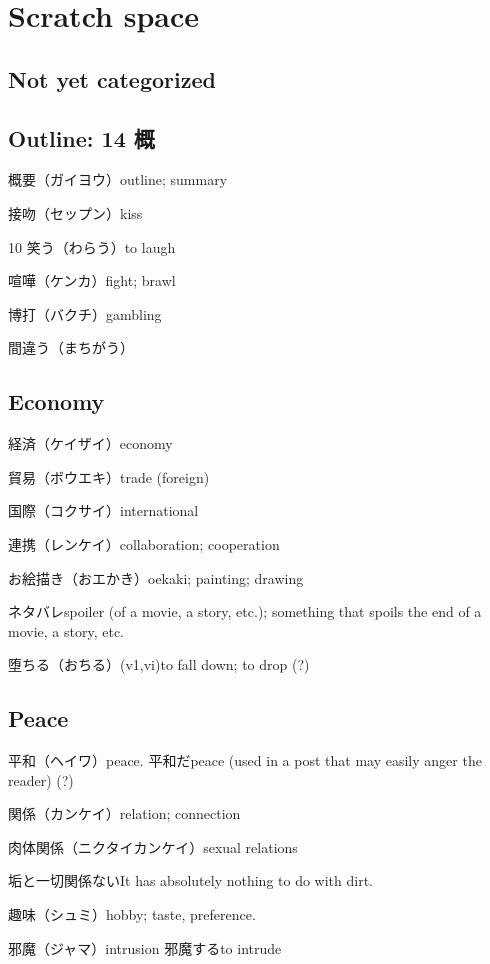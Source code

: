 \chapter{Scratch space}

\section{Not yet categorized}

\section{Outline: 14 概}

概要（ガイヨウ）outline; summary

接吻（セップン）kiss

10 笑う（わらう）to laugh

喧嘩（ケンカ）fight; brawl

博打（バクチ）gambling

間違う（まちがう）

\section{Economy}

経済（ケイザイ）economy

貿易（ボウエキ）trade (foreign)

国際（コクサイ）international

連携（レンケイ）collaboration; cooperation

お絵描き（おエかき）oekaki; painting; drawing

ネタバレspoiler (of a movie, a story, etc.); something that spoils the end of a movie, a story, etc.

堕ちる（おちる）(v1,vi)to fall down; to drop (?)

\section{Peace}

平和（ヘイワ）peace.
平和だpeace (used in a post that may easily anger the reader) (?)

関係（カンケイ）relation; connection

肉体関係（ニクタイカンケイ）sexual relations

垢と一切関係ないIt has absolutely nothing to do with dirt.

趣味（シュミ）hobby; taste, preference.

邪魔（ジャマ）intrusion
邪魔するto intrude

